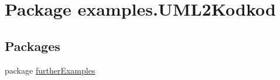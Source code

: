 \hypertarget{namespaceexamples_1_1_u_m_l2_kodkod}{\section{Package examples.\-U\-M\-L2\-Kodkod}
\label{namespaceexamples_1_1_u_m_l2_kodkod}
}
\subsection*{Packages}
\begin{DoxyCompactItemize}
\item 
package \hyperlink{namespaceexamples_1_1_u_m_l2_kodkod_1_1further_examples}{further\-Examples}
\end{DoxyCompactItemize}
